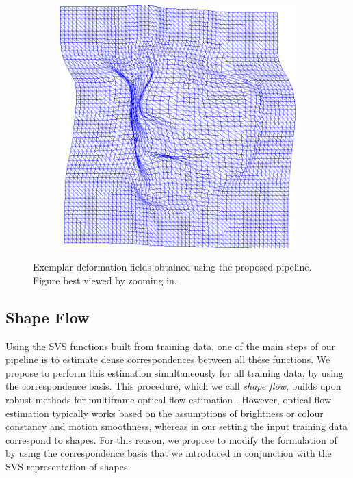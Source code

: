 \begin{figure}[t!]
\begin{subfigure}[b]{0.15\textwidth}
    \end{subfigure}
   	\hfill
    \begin{subfigure}[b]{0.15\textwidth}
            \includegraphics[width=\textwidth]{resources/Fig_Flows/8}
    \end{subfigure}
    \caption{Exemplar deformation fields obtained using the proposed pipeline. Figure best viewed by zooming in.}
    \label{fig:deformationfield}
\end{figure}






\subsection{Shape Flow}
\label{sec:shapeflow}


Using the SVS functions built from training data, one of the main steps of our pipeline is to estimate dense correspondences between all these functions. We propose to perform this estimation simultaneously for all training data, by using the correspondence basis. This procedure, which we call \emph{shape flow}, builds upon robust methods for multiframe optical flow estimation \cite{Garg:2013hu}. However, optical flow estimation typically works based on the assumptions of brightness or colour constancy and motion smoothness, whereas in our setting the input training data correspond to shapes. For this reason, we propose to modify the formulation of \cite{Garg:2013hu} by using the correspondence basis that we introduced in conjunction with the SVS representation of shapes.


